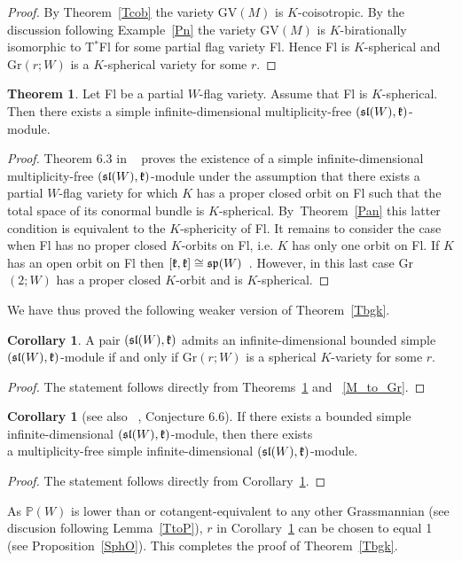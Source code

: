 \documentclass[12pt]{amsart}
\theoremstyle{definition}\newtheorem{theorem}{Theorem}[section]
\newtheorem{corollary}[proposition]{Corollary}
\theoremstyle{definition}\newtheorem{definition}[proposition]{Definition}
\theoremstyle{remark}\newtheorem{example}[proposition]{Example}
\begin{document}
\begin{proof}By Theorem~\ref{Tcob} the variety GV$(M)$ is $K$-coisotropic. By the discussion following Example~\ref{Pn} the variety GV$(M)$ is $K$-birationally isomorphic to T$^*$Fl for some partial flag variety Fl. Hence Fl is $K$-spherical and Gr$(r; W)$ is a $K$-spherical variety for some $r$.\end{proof}
\begin{theorem}\label{Gr_to_M}Let Fl be a partial $W$-flag variety. Assume that Fl is $K$-spherical. Then there exists a simple infinite-dimensional multiplicity-free $(\frak{sl}(W), \frak k)$-module.\end{theorem}
\begin{proof}Theorem 6.3 in ~\cite{PS} proves the existence of a simple infinite-dimensional multiplicity-free $(\frak{sl}(W), \frak k)$-module under the assumption that there exists a partial $W$-flag variety for which $K$ has a proper closed orbit on Fl such that the total space of its conormal bundle is $K$-spherical. By~Theorem~\ref{Pan} this latter condition is equivalent to the $K$-sphericity of Fl. It remains to consider the case when Fl has no proper closed $K$-orbits on Fl, i.e. $K$ has only one orbit on Fl. If $K$ has an open orbit on Fl then $[\frak k,\frak k]\cong\frak{sp}(W)$~\cite{On}. However, in this last case Gr$(2; W)$ has a proper closed $K$-orbit and is $K$-spherical.\end{proof}
We have thus proved the following weaker version of Theorem~\ref{Tbgk}.
\begin{corollary}\label{Gr1}A pair $(\frak{sl}(W), \frak k)$ admits an infinite-dimensional bounded simple $(\frak{sl}(W), \frak k)$-module if and only if $\mathrm{Gr}(r; W)$ is a spherical $K$-variety for some $r$.\end{corollary}
\begin{proof} The statement  follows directly from Theorems~\ref{Gr_to_M} and ~\ref{M_to_Gr}.\end{proof}
\begin{corollary}[see also ~\cite{PS}, Conjecture 6.6]If there exists a bounded simple infinite-dimensional $(\frak{sl}(W), \frak k)$-module, then there exists \\a multiplicity-free simple infinite-dimensional $(\frak{sl}(W), \frak k)$-module.\end{corollary}
\begin{proof}The statement follows directly from Corollary~\ref{Gr1}.\end{proof}
As $\mathbb P(W)$ is lower than or cotangent-equivalent to any other
Grassmannian (see discusion following Lemma~\ref{TtoP}), $r$ in
Corollary~\ref{Gr1} can be chosen to equal 1 (see
Proposition~\ref{SphO}). This completes the proof of
Theorem~\ref{Tbgk}.
\end{document}

